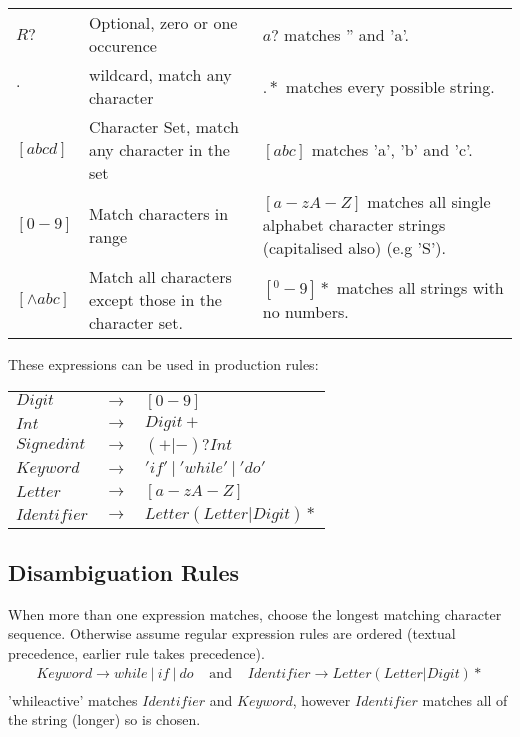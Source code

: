 \documentclass{report}
\begin{document}
\begin{center}
	\begin{tabular}{l l l}
		$R?$          & Optional, zero or one occurence                         & $a?$ matches '' and 'a'.                                                               \\
		$.$           & wildcard, match any character                           & $.*$ matches every possible string.                                                    \\
		$[abcd]$      & Character Set, match any character in the set           & $[abc]$ matches 'a', 'b' and 'c'.                                                      \\
		$[0-9]$       & Match characters in range                               & $[a-zA-Z]$ matches all single alphabet character strings (capitalised also) (e.g 'S'). \\
		$[\land abc]$ & Match all characters except those in the character set. & $[^0-9]*$ matches all strings with no numbers.                                         \\
	\end{tabular}
\end{center}

These expressions can be used in production rules:
\begin{center}
	\begin{tabular}{l c l}
		$Digit$      & $\to$ & $[0-9]$                         \\
		$Int$        & $\to$ & $Digit +$                       \\
		$Signedint$  & $\to$ & $(+|-)? Int$                    \\
		$Keyword$    & $\to$ & $'if' \ | \ 'while' \ | \ 'do'$ \\
		$Letter$     & $\to$ & $[a-zA-Z]$                      \\
		$Identifier$ & $\to$ & $Letter (Letter | Digit) *$     \\
	\end{tabular}
\end{center}
\subsection*{Disambiguation Rules}
When more than one expression matches, choose the longest matching character sequence. Otherwise assume regular expression rules are ordered (textual precedence, earlier rule takes precedence).
\[\begin{matrix}
		Keyword \to while \ | \ if \ | \ do & \text{ and } & Identifier \to Letter (Letter | Digit) * \\
	\end{matrix}\]
'whileactive' matches $Identifier$ and $Keyword$, however $Identifier$ matches all of the string (longer) so is chosen.
\end{document}
